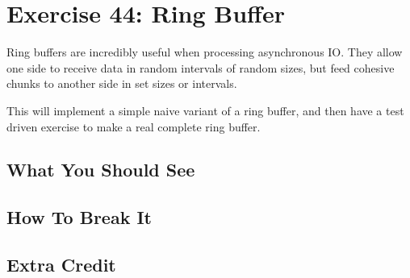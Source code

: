 \chapter{Exercise 44: Ring Buffer}

Ring buffers are incredibly useful when processing asynchronous IO.  They allow one side
to receive data in random intervals of random sizes, but feed cohesive chunks to another
side in set sizes or intervals.

This will implement a simple naive variant of a ring buffer, and then have a test driven
exercise to make a real complete ring buffer.


\section{What You Should See}


\section{How To Break It}


\section{Extra Credit}



